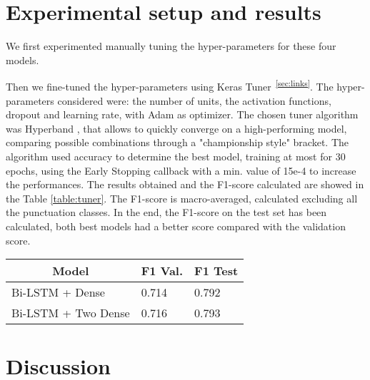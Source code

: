 \documentclass[11pt]{article}
\begin{document}
\section{Experimental setup and results}
\label{sec:results}


We first experimented manually tuning the hyper-parameters for these four models.

Then we fine-tuned the hyper-parameters using Keras Tuner\textsuperscript{~\ref{sec:links}}.
The hyper-parameters considered were: the number of units, the activation functions, dropout and learning rate, with Adam as optimizer. 
The chosen tuner algorithm was Hyperband \cite{arxiv.1603.06560}, that allows to quickly converge on a high-performing model, comparing possible combinations through a "championship style" bracket. The algorithm used accuracy to determine the best model, training at most for 30 epochs, using the Early Stopping callback with a min. value of 15e-4 to increase the performances. 
The results obtained and the F1-score calculated are showed in the Table \ref{table:tuner}. The F1-score is macro-averaged, calculated excluding all the punctuation classes.  
In the end, the F1-score on the test set has been calculated, both best models had a better score compared with the validation score. 

\begin{table}[!h]
\begin{tabular}{l|l|l}
\multicolumn{1}{c|}{\textbf{Model}}       & \textbf{F1 Val.} & \multicolumn{1}{c}{\textbf{F1 Test}} \\ \hline
Bi-LSTM + Dense	    & 0.714		& 0.792	\\
Bi-LSTM + Two Dense	& 0.716		& 0.793
\end{tabular}
\end{table}

\section{Discussion}
\label{sec:discussion}
\end{document}
